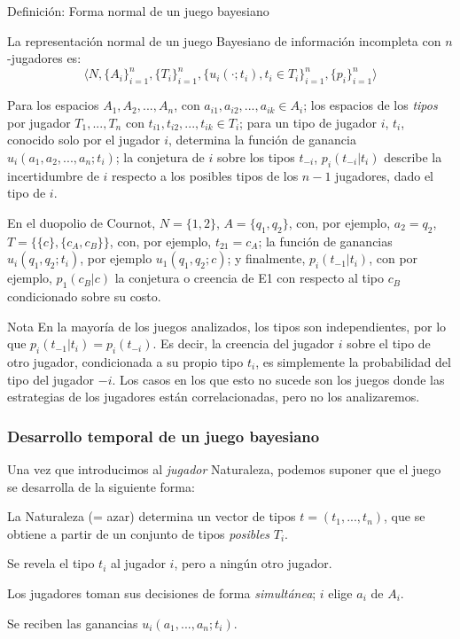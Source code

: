 \documentclass[12pt]{article}
\begin{document}
\begin{mybox}{Definición: Forma normal de un juego bayesiano}
	\begin{defi}
		La representación normal de un juego Bayesiano de información incompleta con $n$-jugadores es:
		\[ \langle N, \{A_i \}_{i=1}^n, \{ T_i \}_{i=1}^n, \{u_i(\cdot; t_i ), t_i \in T_i\}_{i=1}^n, \{ p_i \}_{i=1}^n \rangle \]

		Para los espacios $A_1, A_2, ..., A_n$, con $a_{i1}, a_{i2}, ..., a_{ik} \in A_i$; los espacios de los \textit{tipos} por jugador $T_1, ..., T_n$ con $t_{i1}, t_{i2}, ..., t_{ik} \in T_i$; para un tipo de jugador $i$, $t_i$, conocido solo por el jugador $i$, determina la función de ganancia $u_{i}(a_1, a_2, ..., a_n; t_i)$; la conjetura de $i$ sobre los tipos $t_{-i}$, $p_i(t_{-i}|t_i)$ describe la incertidumbre de $i$ respecto a los posibles tipos de los $n-1$ jugadores, dado el tipo de $i$.

	\end{defi}
\end{mybox}

En el duopolio de Cournot, $N = \{1, 2\}$, $A=\{q_1, q_2 \}$,  con, por ejemplo,  $a_2 = q_2$, $T = \{\{c\}, \{c_A, c_B\}\}$, con, por ejemplo, $t_{21} = c_A$; la función de ganancias $u_i(q_1, q_2; t_i)$, por ejemplo $u_1(q_1, q_2; c)$; y finalmente, $p_i(t_{-1}|t_i)$, con por ejemplo, $p_1(c_B|c)$ la conjetura o creencia de E1 con respecto al tipo $c_B$ condicionado sobre su costo.

\begin{summarybox}[colback=red!15]{Nota}
	En la mayoría de los juegos analizados, los tipos son independientes, por lo que $p_i(t_{-1}|t_i) = p_i(t_{-i})$. Es decir, la creencia del jugador $i$ sobre el tipo de otro jugador, condicionada a su propio tipo $t_i$, es simplemente la probabilidad del tipo del jugador $-i$. Los casos en los que esto no sucede son los juegos donde las estrategias de los jugadores están correlacionadas, pero no los analizaremos.
\end{summarybox}

\subsubsection{Desarrollo temporal de un juego bayesiano}

Una vez que introducimos al \textit{jugador} Naturaleza, podemos suponer que el juego se desarrolla de la siguiente forma:

\begin{myenum}
	\item La Naturaleza (= azar) determina un vector de tipos $t = (t_1,...,t_n)$, que se obtiene a partir de un conjunto de tipos \textit{posibles} $T_i$.
	\item Se revela el tipo $t_i$ al jugador $i$, pero a ningún otro jugador.
	\item Los jugadores toman sus decisiones de forma \textit{simultánea}; $i$ elige $a_i$ de $A_i$.
	\item Se reciben las ganancias $u_i(a_1,...,a_n;t_i)$.
\end{myenum}
\end{document}
